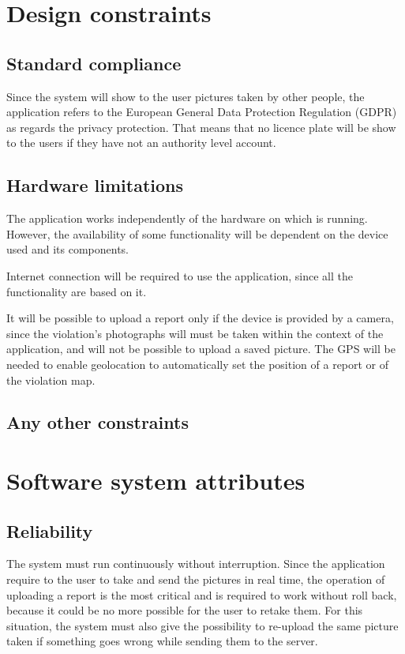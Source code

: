 \documentclass[../RASD.tex]{subfiles}
\begin{document}
        \section{Design constraints}\label{sec:design-constraints}
            \subsection{Standard compliance}\label{subsec:standard-compliance}
            Since the system will show to the user pictures taken by other people, the application refers to the European General Data Protection Regulation (GDPR) as regards the privacy protection. That means that no licence plate will be show to the users if they have not an authority level account.
            \subsection{Hardware limitations}\label{subsec:hardware-limitations}
            The application works independently of the hardware on which is running. However, the availability of some functionality will be dependent on the device used and its components.

            Internet connection will be required to use the application, since all the functionality are based on it.

            It will be possible to upload a report only if the device is provided by a camera, since the violation's photographs will must be taken within the context of the application, and will not be possible to upload a saved picture. The GPS will be needed to enable geolocation to automatically set the position of a report or of the violation map.
            \subsection{Any other constraints}\label{subsec:any-other-constraints}
        \section{Software system attributes}\label{sec:software-system-attributes}
            \subsection{Reliability}\label{subsec:reliability}
            The system must run continuously without interruption. Since the application require to the user to take and send the pictures in real time, the operation of uploading a report is the most critical and is required to work without roll back, because it could be no more possible for the user to retake them. For this situation, the system must also give the possibility to re-upload the same picture taken if something goes wrong while sending them to the server.
\end{document}
